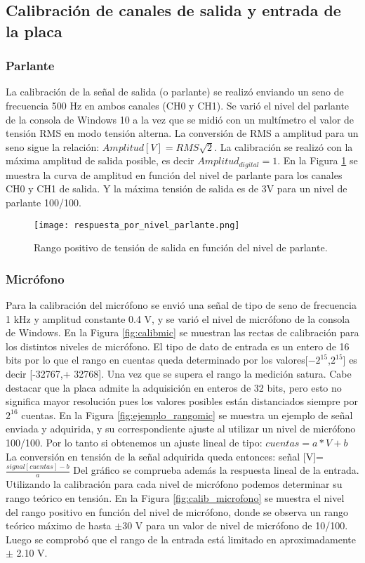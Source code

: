 \documentclass[a4paper, 11pt]{article}
\begin{document}
\subsection*{Calibración de canales de salida y entrada de la placa}
\subsubsection*{Parlante}
La calibración de la señal de salida (o parlante) se realizó enviando un seno de frecuencia 500 Hz en ambos canales (CH0 y CH1). Se varió el nivel del parlante de la consola de Windows 10 a la vez que se midió con un multímetro el valor de tensión RMS en modo tensión alterna. La conversión de RMS a amplitud para un seno sigue la relación:
$Amplitud[V]={RMS}{\sqrt2}$.
La calibración se realizó con la máxima amplitud de salida posible, es decir $Amplitud_{digital}=1$. En la Figura \ref{fig:calib_parlante} se muestra la curva de amplitud en función del nivel de parlante para los canales CH0 y CH1 de salida. Y la máxima tensión de salida es de 3V para un nivel de parlante 100/100.

\begin{figure} [H]
\centering
\texttt{[image: respuesta\_por\_nivel\_parlante.png]}
\caption{Rango positivo de tensión de salida en función del nivel de parlante.\label{fig:calib_parlante}}
\end{figure} 

\subsubsection*{Micrófono}
Para la calibración del micrófono se envió una señal de tipo de seno de frecuencia 1 kHz y amplitud constante 0.4 V, y se varió el nivel de micrófono de la consola de Windows. En la Figura \ref{fig:calibmic} se muestran las rectas de calibración para los distintos niveles de micrófono. El tipo de dato de entrada es un entero de 16 bits por lo que el rango en cuentas queda determinado por los valores[$-2^{15}$,$2^{15}$] es decir [-32767,+ 32768]. Una vez que se supera el rango la medición satura. Cabe destacar que la placa admite la adquisición en enteros de 32 bits, pero esto no significa mayor resolución pues los valores posibles están distanciados siempre por $2^{16}$  cuentas.
En la Figura \ref{fig:ejemplo_rangomic} se muestra un ejemplo de señal enviada y adquirida, y su correspondiente ajuste al utilizar un nivel de micrófono 100/100. Por lo tanto si obtenemos un ajuste lineal de tipo:
$cuentas=a*V+b$
La conversión en tensión de la señal adquirida queda entonces:
señal [V]=$\frac{signal[cuentas]-b}{a}$
Del gráfico se comprueba además la respuesta lineal de la entrada.
Utilizando la calibración para cada nivel de micrófono podemos determinar su rango teórico en tensión. En la Figura \ref{fig:calib_microfono} se muestra el nivel del rango positivo en función del nivel de micrófono, donde se observa un rango teórico máximo de hasta $\pm$30 V para un valor de nivel de micrófono de 10/100. Luego se comprobó que el rango de la entrada está limitado en aproximadamente $\pm$ 2.10 V.
\end{document}
